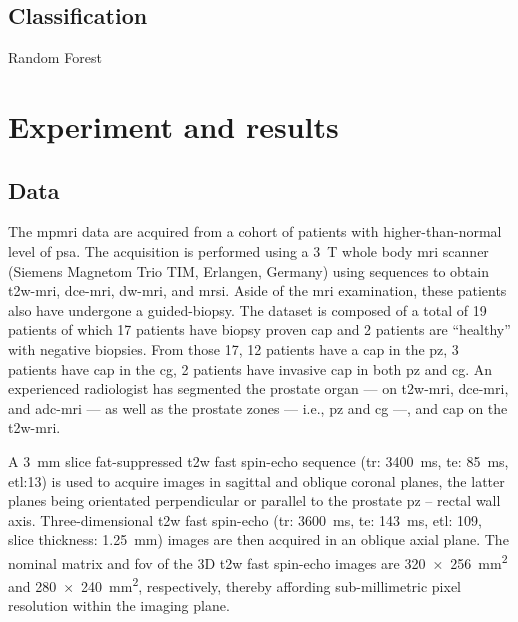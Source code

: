 \documentclass[a4paper,num-refs]{wiley-article}
\begin{document}
\subsection{Classification}

Random Forest

\section{Experiment and results}
\label{sec:experiments}

\subsection{Data}\label{sec:data}

The \ac{mpmri} data are acquired from a cohort of patients with higher-than-normal level of \ac{psa}.
The acquisition is performed using a \SI{3}{\tesla} whole body \ac{mri} scanner (Siemens Magnetom Trio TIM, Erlangen, Germany) using sequences to obtain \ac{t2w}-\ac{mri}, \ac{dce}-\ac{mri}, \ac{dw}-\ac{mri}, and \ac{mrsi}.
Aside of the \ac{mri} examination, these patients also have undergone a guided-biopsy.
The dataset is composed of a total of 19 patients of which 17 patients have biopsy proven \ac{cap} and 2 patients are ``healthy'' with negative biopsies.
From those 17, 12 patients have a \ac{cap} in the \ac{pz}, 3 patients have \ac{cap} in the \ac{cg}, 2 patients have invasive \ac{cap} in both \ac{pz} and \ac{cg}.
An experienced radiologist has segmented the prostate organ --- on \ac{t2w}-\ac{mri}, \ac{dce}-\ac{mri}, and \ac{adc}-\ac{mri} --- as well as the prostate zones --- i.e., \ac{pz} and \ac{cg} ---, and \ac{cap} on the \ac{t2w}-\ac{mri}.

A \SI{3}{\mm} slice fat-suppressed \ac{t2w} fast spin-echo sequence (\ac{tr}: \SI{3400}{\ms}, \ac{te}: \SI{85}{\ms}, \ac{etl}:13) is used to acquire images in sagittal and oblique coronal planes, the latter planes being orientated perpendicular or parallel to the prostate \ac{pz} – rectal wall axis.
Three-dimensional \ac{t2w} fast spin-echo (\ac{tr}: \SI{3600}{\ms}, \ac{te}: \SI{143}{\ms}, \ac{etl}: 109, slice thickness: \SI{1.25}{\mm}) images are then acquired in an oblique axial plane.
The nominal matrix and \ac{fov} of the 3D \ac{t2w} fast spin-echo images are \SI[product-units=repeat]{320x256}{\milli\metre\squared} and \SI[product-units=repeat]{280x240}{\milli\metre\squared}, respectively, thereby affording sub-millimetric pixel resolution within the imaging plane.
\end{document}
